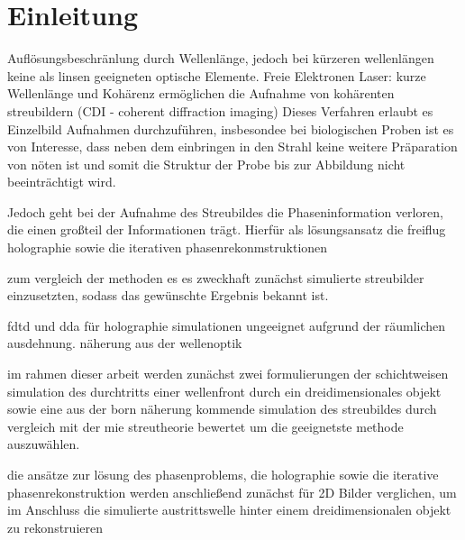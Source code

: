 \chapter{Einleitung}
Auflösungsbeschränlung durch Wellenlänge, jedoch bei kürzeren wellenlängen keine als linsen geeigneten optische Elemente.
Freie Elektronen Laser: kurze Wellenlänge und Kohärenz
ermöglichen die Aufnahme von kohärenten streubildern (CDI - coherent diffraction imaging)
Dieses Verfahren erlaubt es Einzelbild Aufnahmen durchzuführen, insbesondee bei biologischen Proben ist es von Interesse, dass neben dem einbringen in den Strahl keine weitere Präparation von nöten ist und somit die Struktur der Probe bis zur Abbildung nicht beeinträchtigt wird. 

Jedoch geht bei der Aufnahme des Streubildes die Phaseninformation verloren, die einen großteil der Informationen trägt.
Hierfür als lösungsansatz die freiflug holographie sowie die iterativen phasenrekonmstruktionen

zum vergleich der methoden es es zweckhaft zunächst simulierte streubilder einzusetzten, sodass das gewünschte Ergebnis bekannt ist.

fdtd und dda für holographie simulationen ungeeignet aufgrund der räumlichen ausdehnung.
näherung aus der wellenoptik

im rahmen dieser arbeit werden zunächst zwei formulierungen der schichtweisen simulation des durchtritts einer wellenfront durch ein dreidimensionales objekt sowie eine aus der born näherung kommende simulation des streubildes durch vergleich mit der mie streutheorie bewertet um die geeignetste methode auszuwählen.

die ansätze zur lösung des phasenproblems, die holographie sowie die iterative phasenrekonstruktion werden anschließend zunächst für 2D Bilder verglichen, um im Anschluss die simulierte austrittswelle hinter einem dreidimensionalen objekt zu rekonstruieren

